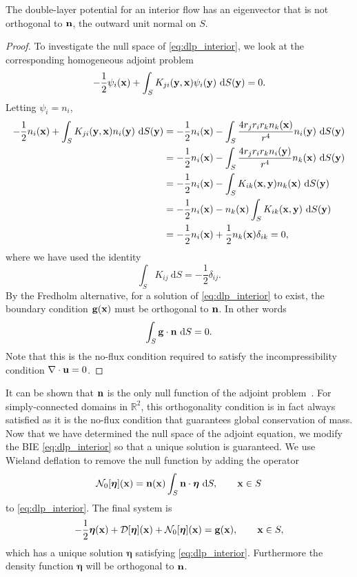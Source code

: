 \begin{proposition}
The double-layer potential for an interior flow has an eigenvector that is not orthogonal to ${\mathbf{n}}$, the outward unit normal on $S$. 
\end{proposition}
\begin{proof}
To investigate the null space of \eqref{eq:dlp_interior}, we look at the corresponding homogeneous adjoint problem
\begin{equation}\label{eq:dlp-adjoint} -\frac{1}{2}\psi_i({\mathbf{x}}) + \int_S K_{ji}({\mathbf{y}},{\mathbf{x}})\psi_i({\mathbf{y}})~\text{d}S({\mathbf{y}}) = 0.\end{equation}
Letting $\psi_i = n_i$,
\begin{align*} -\frac{1}{2}n_i({\mathbf{x}}) + \int_S K_{ji}({\mathbf{y}},{\mathbf{x}})n_i({\mathbf{y}})~\text{d}S({\mathbf{y}}) &=-\frac{1}{2}n_i({\mathbf{x}})  - \int_S \frac{4 r_j r_i r_k n_k({\mathbf{x}})}{r^4}n_i({\mathbf{y}})~\text{d}S({\mathbf{y}}) \\
	&= -\frac{1}{2}n_i({\mathbf{x}}) - \int_S\frac{4 r_j r_i r_k n_i({\mathbf{y}})}{r^4}n_k({\mathbf{x}})~\text{d}S({\mathbf{y}})\\
	&= -\frac{1}{2}n_i({\mathbf{x}}) - \int_S K_{ik}({\mathbf{x}},{\mathbf{y}})n_k({\mathbf{x}})~\text{d}S({\mathbf{y}})\\
	&=-\frac{1}{2}n_i({\mathbf{x}}) - n_k({\mathbf{x}})\int_S K_{ik}({\mathbf{x}},{\mathbf{y}})~\text{d}S({\mathbf{y}})\\
	&=-\frac{1}{2}n_i({\mathbf{x}}) + \frac{1}{2}n_k({\mathbf{x}})\delta_{ik} = 0,
\end{align*}
where we have used the identity \cite{Ladyzhenskaya1963}
\[\int_S K_{ij} ~\text{d}S = -\frac{1}{2}\delta_{ij}.\]
By the Fredholm alternative, for a solution of \eqref{eq:dlp_interior} to exist, the boundary condition $\mathbf{g}({\mathbf{x}})$ must be orthogonal to ${\mathbf{n}}$. In other words
\[ \int_S \mathbf{g}\cdot{\mathbf{n}}~\text{d}S = 0.\]
Note that this is the no-flux condition required to satisfy the incompressibility condition $\nabla\cdot{\mathbf{u}} = 0$.
\end{proof}

It can be shown that ${\mathbf{n}}$ is the only null function of the adjoint problem~\cite{Ladyzhenskaya1963,Power1993,Karrila1989}. For simply-connected domains in $\mathbb{R}^2$, this orthogonality condition is in fact always satisfied as it is the no-flux condition that guarantees global conservation of mass. Now that we have determined the null space of the adjoint equation, we modify the BIE \eqref{eq:dlp_interior} so that a unique solution is guaranteed. We use Wieland deflation \cite{Karrila1989}  to remove the null function by adding  the operator
\[ \mathcal{N}_0[\bm{\eta}]({\mathbf{x}}) = {\mathbf{n}}({\mathbf{x}})\int_S {\mathbf{n}} \cdot \bm{\eta}~\text{d}S,\qquad {\mathbf{x}}\in S\]
to \eqref{eq:dlp_interior}. The final system is 
\begin{equation}\label{eq:interior_complete} -\frac{1}{2}\bm{\eta}({\mathbf{x}}) + \mathcal{D}[\bm{\eta} ]({\mathbf{x}}) + \mathcal{N}_0[\bm{\eta}]({\mathbf{x}}) = \mathbf{g}({\mathbf{x}}),\qquad {\mathbf{x}}\in S,\end{equation}
which has a unique solution $\bm{\eta}$ satisfying \eqref{eq:dlp_interior}. Furthermore the density function $\bm{\eta}$ will be orthogonal to ${\mathbf{n}}$. 


